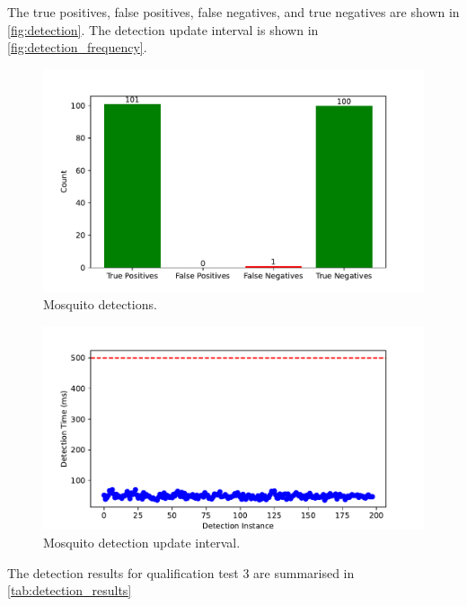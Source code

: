 The true positives, false positives, false negatives, and true negatives are shown in \autoref{fig:detection}. The detection update interval is shown in \autoref{fig:detection_frequency}.
\begin{figure}[h]
  \centering
  \includegraphics[width=\textwidth]{figures/results/detection.pdf}
  \caption{Mosquito detections.}
  \label{fig:detection}
\end{figure}
\begin{figure}[h]
  \centering
  \includegraphics[width=\textwidth]{figures/results/detection_frequency.pdf}
  \caption{Mosquito detection update interval.}
  \label{fig:detection_frequency}
\end{figure}
The detection results for qualification test 3 are summarised in \autoref{tab:detection_results}
